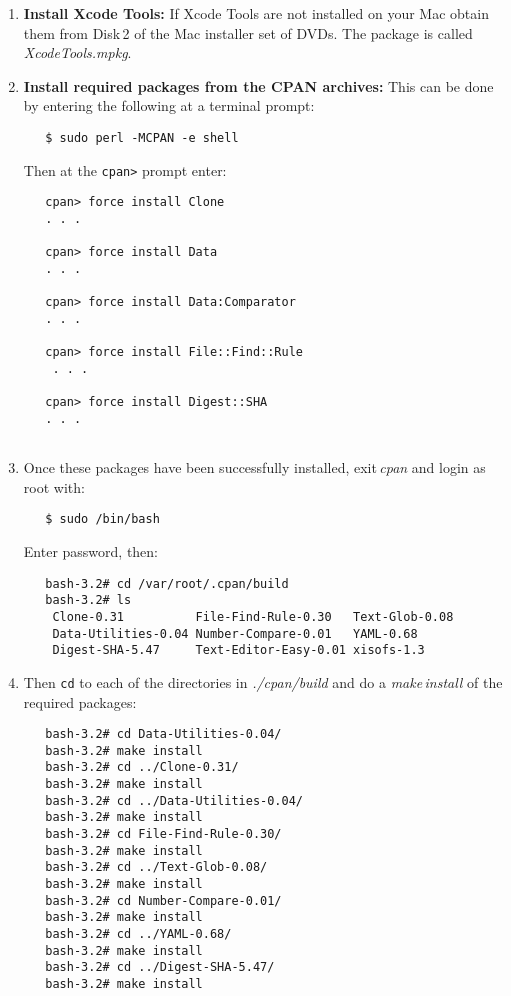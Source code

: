 \documentclass[12pt]{article}
\begin{document}
\begin{enumerate}
\item {\bf Install Xcode Tools:} If Xcode Tools are not installed on your Mac obtain them from Disk\,2 of the Mac installer set of DVDs. The package is called\,{\it XcodeTools.mpkg}.

\item {\bf Install required packages from the CPAN archives:} This can be done by entering the following at a terminal prompt:
\begin{verbatim}
   $ sudo perl -MCPAN -e shell
\end{verbatim}
Then at the {\tt cpan>} prompt enter:
\begin{verbatim}
   cpan> force install Clone
   . . . 

   cpan> force install Data
   . . . 

   cpan> force install Data:Comparator
   . . . 

   cpan> force install File::Find::Rule
    . . .

   cpan> force install Digest::SHA
   . . . 
   
\end{verbatim}

\item Once these packages have been successfully installed, exit\,{\it cpan} and login as root with:
\begin{verbatim}
   $ sudo /bin/bash
\end{verbatim}
Enter password, then:
\begin{verbatim}
   bash-3.2# cd /var/root/.cpan/build
   bash-3.2# ls
    Clone-0.31          File-Find-Rule-0.30   Text-Glob-0.08
    Data-Utilities-0.04 Number-Compare-0.01   YAML-0.68
    Digest-SHA-5.47     Text-Editor-Easy-0.01 xisofs-1.3
\end{verbatim}

\item Then {\tt cd} to each of the directories in {\it ./cpan/build} and do a {\it make\,install} of the required packages:
\begin{verbatim}
   bash-3.2# cd Data-Utilities-0.04/
   bash-3.2# make install
   bash-3.2# cd ../Clone-0.31/
   bash-3.2# make install
   bash-3.2# cd ../Data-Utilities-0.04/
   bash-3.2# make install
   bash-3.2# cd File-Find-Rule-0.30/
   bash-3.2# make install
   bash-3.2# cd ../Text-Glob-0.08/
   bash-3.2# make install
   bash-3.2# cd Number-Compare-0.01/
   bash-3.2# make install
   bash-3.2# cd ../YAML-0.68/
   bash-3.2# make install
   bash-3.2# cd ../Digest-SHA-5.47/
   bash-3.2# make install
\end{verbatim}

\end{enumerate}
\end{document}

